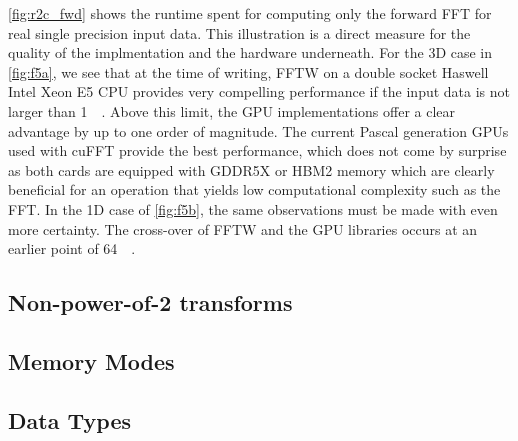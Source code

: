 \cref{fig:r2c_fwd} shows the runtime spent for computing only the forward FFT for real single precision input data. This illustration is a direct measure for the quality of the implmentation and the hardware underneath. For the 3D case in \cref{fig:f5a}, we see that at the time of writing, FFTW on a double socket Haswell Intel Xeon E5 CPU provides very compelling performance if the input data is not larger than \SI{1}{\mebi\byte}. Above this limit, the GPU implementations offer a clear advantage by up to one order of magnitude. The current Pascal generation GPUs used with cuFFT provide the best performance, which does not come by surprise as both cards are equipped with GDDR5X or HBM2 memory which are clearly beneficial for an operation that yields low computational complexity such as the FFT. In the 1D case of \cref{fig:f5b}, the same observations must be made with even more certainty. The cross-over of FFTW and the GPU libraries occurs at an earlier point of \SI{64}{\kibi\byte}.  

\subsection{Non-power-of-2 transforms}
\label{ssec:nonpowerof2}

\subsection{Memory Modes}
\label{ssec:mem_mode}

\subsection{Data Types}
\label{ssec:data_types}

